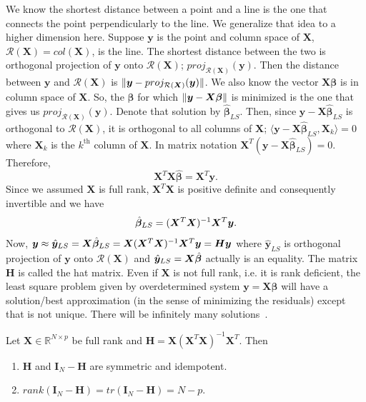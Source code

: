 We know the shortest distance between a point and a line
is the one that connects the point perpendicularly to the line.
We generalize that idea to a higher dimension here.
Suppose $\bm y$ is the point and column space of 
$\bm X$, $\mathcal{R}(\bm X) = col(\bm X)$, is the line.
The shortest distance between the two is orthogonal
projection of $\bm y$ onto $\mathcal{R}(\bm X)$; $proj_{\mathcal{R}(\bm X)}(\bm y)$.
Then the distance between $\bm y$ and $\mathcal{R}(\bm X)$
is $\lVert{\bm y - proj_{\mathcal{R}(\bm X)}(\bm y)}\rVert$.
We also know the vector $\bm X \bm \beta$ is in column space of $\bm X$.
So, the $\bm \beta$ for which 
$\lVert{\bm y - \bm X \bm \beta}\rVert$ is minimized
is the one that gives us $proj_{\mathcal{R}(\bm X)}(\bm y)$.
Denote that solution by $\hat {\bm \beta}_{LS}$. 
Then, since $\bm y - \bm X \hat{\bm \beta}_{LS}$ is orthogonal to 
$\mathcal{R}(\bm X)$, it is orthogonal to all columns of $\bm X$;
$\langle \bm y - \bm X \hat{\bm \beta}_{LS}, \bm X_{k} \rangle = 0$
where $\bm X_k$ is the $k^{\text{th}}$ column of $\bm X$.
In matrix notation $\bm X^T (\bm y - \bm X \hat{\bm \beta}_{LS}) = 0$.
Therefore, 
\[
\bm X^T \bm X \hat{\bm \beta} = \bm X^T \bm y.
\]
Since we assumed $\bm X$ is full rank, $\bm X^T \bm X$
is positive definite and consequently invertible and we have
\[ \hat{\bm \beta}_{LS} = (\bm X^T \bm X)^{-1} \bm X^T \bm y.\]
Now, $\bm y \approx \hat {\bm y}_{LS} = \bm X \hat {\bm \beta}_{LS} = \bm X (\bm X^T \bm X)^{-1} \bm X^T \bm y = \bm H \bm y$
where $\hat {\bm y}_{LS}$ is orthogonal projection of $\bm y$
onto $\mathcal{R}(\bm X)$ and 
$\hat {\bm y}_{LS} = \bm X \hat {\bm \beta}$
actually is an equality. The matrix $\bm H$ 
is called the hat matrix.
Even if $\bm X$ is not full rank, i.e. it is rank deficient, 
the least square problem given by overdetermined system 
${\bm y} = {\bm X \bm \beta}$
will have a solution/best approximation 
(in the sense of minimizing
the residuals) except that is not unique. There will
be infinitely many solutions~\citep{watkinsfund}.

\begin{thm}
Let $\bm X \in \mathbb{R}^{N \times p}$ be full rank and
$\bm H = \bm X (\bm X^T \bm X)^{-1} \bm X^T$. Then 
\begin{enumerate}[label=(\alph*)]
\item $\bm H$ and $\bm I_N - \bm H$ are symmetric 
and idempotent.
\item $rank(\bm I_N - \bm H) = tr(\bm I_N - \bm H) = N - p$.
\end{enumerate}
\end{thm}

